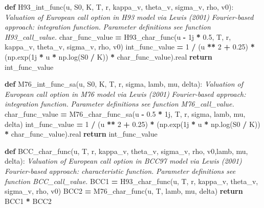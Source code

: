 \documentclass[
]{book}
\newenvironment{Shaded}{\begin{snugshade}}{\end{snugshade}}
\newcommand{\CommentTok}[1]{\textcolor[rgb]{0.56,0.35,0.01}{\textit{#1}}}
\newcommand{\ControlFlowTok}[1]{\textcolor[rgb]{0.13,0.29,0.53}{\textbf{#1}}}
\newcommand{\DecValTok}[1]{\textcolor[rgb]{0.00,0.00,0.81}{#1}}
\newcommand{\FloatTok}[1]{\textcolor[rgb]{0.00,0.00,0.81}{#1}}
\newcommand{\KeywordTok}[1]{\textcolor[rgb]{0.13,0.29,0.53}{\textbf{#1}}}
\newcommand{\NormalTok}[1]{#1}
\newcommand{\OperatorTok}[1]{\textcolor[rgb]{0.81,0.36,0.00}{\textbf{#1}}}
\newcommand{\OtherTok}[1]{\textcolor[rgb]{0.56,0.35,0.01}{#1}}
\begin{document}
\begin{Shaded}
\begin{Highlighting}[]
\KeywordTok{def}\NormalTok{ H93\_int\_func(u, S0, K, T, r, kappa\_v, theta\_v, sigma\_v, rho, v0):}
  \CommentTok{\textquotesingle{}\textquotesingle{}\textquotesingle{} Valuation of European call option in H93 model via Lewis (2001)}
\CommentTok{  Fourier{-}based approach: integration function.}
\CommentTok{  Parameter definitions see function H93\_call\_value.\textquotesingle{}\textquotesingle{}\textquotesingle{}}
\NormalTok{  char\_func\_value }\OperatorTok{=}\NormalTok{ H93\_char\_func(u }\OperatorTok{{-}} \OtherTok{1j} \OperatorTok{*} \FloatTok{0.5}\NormalTok{, T, r, kappa\_v, theta\_v, sigma\_v, rho, v0)}
\NormalTok{  int\_func\_value }\OperatorTok{=} \DecValTok{1} \OperatorTok{/}\NormalTok{ (u }\OperatorTok{**} \DecValTok{2} \OperatorTok{+} \FloatTok{0.25}\NormalTok{) }\OperatorTok{*}\NormalTok{ (np.exp(}\OtherTok{1j} \OperatorTok{*}\NormalTok{ u }\OperatorTok{*}\NormalTok{ np.log(S0 }\OperatorTok{/}\NormalTok{ K)) }\OperatorTok{*}\NormalTok{ char\_func\_value).real}
  \ControlFlowTok{return}\NormalTok{ int\_func\_value}


\KeywordTok{def}\NormalTok{ M76\_int\_func\_sa(u, S0, K, T, r, sigma, lamb, mu, delta):}
  \CommentTok{\textquotesingle{}\textquotesingle{}\textquotesingle{} Valuation of European call option in M76 model via Lewis (2001)}
\CommentTok{  Fourier{-}based approach: integration function.}
\CommentTok{  Parameter definitions see function M76\_call\_value.\textquotesingle{}\textquotesingle{}\textquotesingle{}}
\NormalTok{  char\_func\_value }\OperatorTok{=}\NormalTok{ M76\_char\_func\_sa(u }\OperatorTok{{-}} \FloatTok{0.5} \OperatorTok{*} \OtherTok{1j}\NormalTok{, T, r, sigma, lamb, mu, delta)}
\NormalTok{  int\_func\_value }\OperatorTok{=} \DecValTok{1} \OperatorTok{/}\NormalTok{ (u }\OperatorTok{**} \DecValTok{2} \OperatorTok{+} \FloatTok{0.25}\NormalTok{) }\OperatorTok{*}\NormalTok{ (np.exp(}\OtherTok{1j} \OperatorTok{*}\NormalTok{ u }\OperatorTok{*}\NormalTok{ np.log(S0 }\OperatorTok{/}\NormalTok{ K)) }\OperatorTok{*}\NormalTok{ char\_func\_value).real}
  \ControlFlowTok{return}\NormalTok{ int\_func\_value}

\KeywordTok{def}\NormalTok{ BCC\_char\_func(u, T, r, kappa\_v, theta\_v, sigma\_v, rho, v0,lamb, mu, delta):}
  \CommentTok{\textquotesingle{}\textquotesingle{}\textquotesingle{} Valuation of European call option in BCC97 model via Lewis (2001)}
\CommentTok{  Fourier{-}based approach: characteristic function.}
\CommentTok{  Parameter definitions see function BCC\_call\_value.\textquotesingle{}\textquotesingle{}\textquotesingle{}}
\NormalTok{  BCC1 }\OperatorTok{=}\NormalTok{ H93\_char\_func(u, T, r, kappa\_v, theta\_v, sigma\_v, rho, v0)}
\NormalTok{  BCC2 }\OperatorTok{=}\NormalTok{ M76\_char\_func(u, T, lamb, mu, delta)}
  \ControlFlowTok{return}\NormalTok{ BCC1 }\OperatorTok{*}\NormalTok{ BCC2}


\end{Highlighting}
\end{Shaded}
\end{document}
